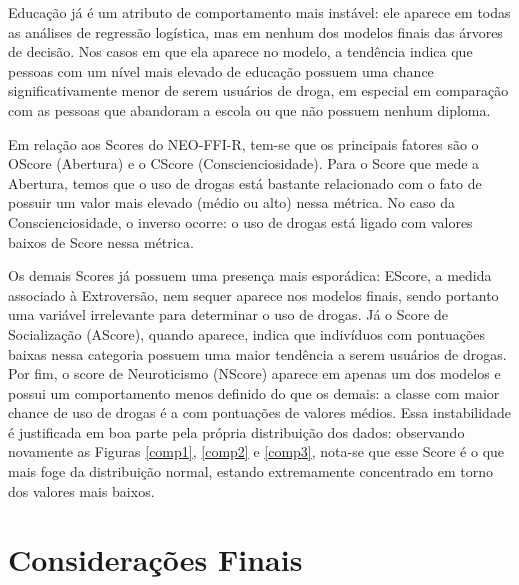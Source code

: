 \documentclass[
	article,			%
	11pt,				%
	oneside,			%
	a4paper,			%
	english,			%
	brazil,				%
	sumario=tradicional
	]{abntex2}
\begin{document}
Educação já é um atributo de comportamento mais instável: ele aparece em todas as análises de regressão logística, mas em nenhum dos modelos finais das árvores de decisão. Nos casos em que ela aparece no modelo, a tendência indica que pessoas com um nível mais elevado de educação possuem uma chance significativamente menor de serem usuários de droga, em especial em comparação com as pessoas que abandoram a escola ou que não possuem nenhum diploma.

Em relação aos Scores do NEO-FFI-R, tem-se que os principais fatores são o OScore (Abertura) e o CScore (Conscienciosidade). Para o Score que mede a Abertura, temos que o uso de drogas está bastante relacionado com o fato de possuir um valor mais elevado (médio ou alto) nessa métrica. No caso da Conscienciosidade, o inverso ocorre: o uso de drogas está ligado com valores baixos de Score nessa métrica.

Os demais Scores já possuem uma presença mais esporádica: EScore, a medida associado à Extroversão, nem sequer aparece nos modelos finais, sendo portanto uma variável irrelevante para determinar o uso de drogas. Já o Score de Socialização (AScore), quando aparece, indica que indivíduos com pontuações baixas nessa categoria possuem uma maior tendência a serem usuários de drogas. Por fim, o score de Neuroticismo (NScore) aparece em apenas um dos modelos e possui um comportamento menos definido do que os demais: a classe com maior chance de uso de drogas é a com pontuações de valores médios. Essa instabilidade é justificada em boa parte pela própria distribuição dos dados: observando novamente as Figuras \ref{comp1}, \ref{comp2} e \ref{comp3}, nota-se que esse Score é o que mais foge da distribuição normal, estando extremamente concentrado em torno dos valores mais baixos.



\section{Considerações Finais}
\end{document}
